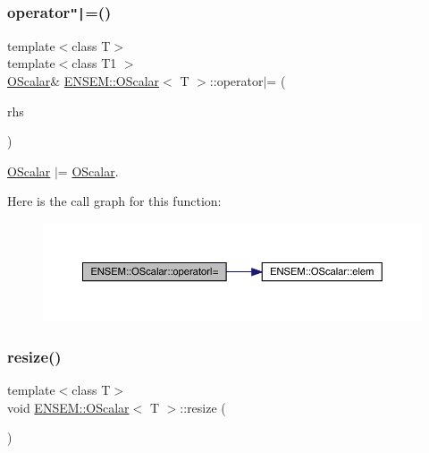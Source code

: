 \subsubsection{\texorpdfstring{operator\texttt{"|}=()}{operator|=()}\hspace{0.1cm}{\footnotesize\ttfamily [2/2]}}
{\footnotesize\ttfamily template$<$class T$>$ \\
template$<$class T1 $>$ \\
\mbox{\hyperlink{classENSEM_1_1OScalar}{O\+Scalar}}\& \mbox{\hyperlink{classENSEM_1_1OScalar}{E\+N\+S\+E\+M\+::\+O\+Scalar}}$<$ T $>$\+::operator$\vert$= (\begin{DoxyParamCaption}\item[{const \mbox{\hyperlink{classENSEM_1_1OScalar}{O\+Scalar}}$<$ T1 $>$ \&}]{rhs }\end{DoxyParamCaption})\hspace{0.3cm}{\ttfamily [inline]}}



\mbox{\hyperlink{classENSEM_1_1OScalar}{O\+Scalar}} $\vert$= \mbox{\hyperlink{classENSEM_1_1OScalar}{O\+Scalar}}. 

Here is the call graph for this function\+:
\nopagebreak
\begin{figure}[H]
\begin{center}
\leavevmode
\includegraphics[width=350pt]{da/d80/classENSEM_1_1OScalar_aeffba612ea04593253d41332d6d2aa82_cgraph}
\end{center}
\end{figure}
\mbox{\label{classENSEM_1_1OScalar_ab7d5b96a7f1a3451bedd04eda3169c84}} 
\subsubsection{\texorpdfstring{resize()}{resize()}\hspace{0.1cm}{\footnotesize\ttfamily [1/4]}}
{\footnotesize\ttfamily template$<$class T$>$ \\
void \mbox{\hyperlink{classENSEM_1_1OScalar}{E\+N\+S\+E\+M\+::\+O\+Scalar}}$<$ T $>$\+::resize (\begin{DoxyParamCaption}\item[{const \mbox{\hyperlink{classENSEM_1_1OScalar}{O\+Scalar}}$<$ T $>$ \&}]{ }\end{DoxyParamCaption})\hspace{0.3cm}{\ttfamily [inline]}}

